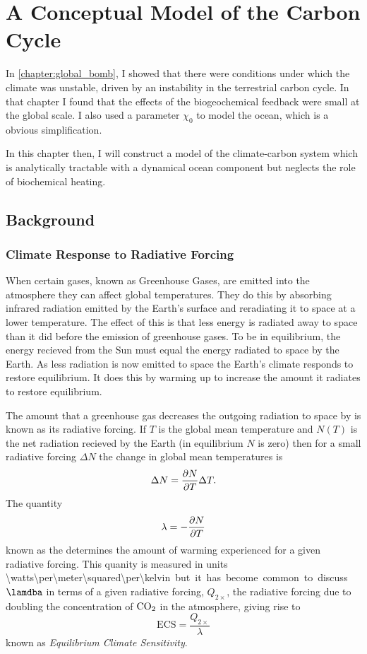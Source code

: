 \chapter{A Conceptual Model of the Carbon Cycle}
\label{chapter:conceptual_carbon_cycle}
\graphicspath{{box_ocean/figs/}}

In \cref{chapter:global_bomb}, I showed that there were conditions under which the climate was unstable,
driven by an instability in the terrestrial carbon cycle. In that chapter I found that the effects of
the biogeochemical feedback were small at the global scale. I also used a parameter $\chi_0$ to model the ocean,
which is a obvious simplification.

In this chapter then, I will construct a model of the climate-carbon system which is analytically tractable
with a dynamical ocean component but neglects the role of biochemical heating.

\section{Background}

\subsection{Climate Response to Radiative Forcing}
When certain gases, known as Greenhouse Gases, are emitted into the atmosphere they can affect global temperatures.
They do this by absorbing infrared radiation emitted by the Earth's surface and reradiating it to space at a lower temperature.
The effect of this is that less energy is radiated away to space than it did before the emission of greenhouse gases. To be in
equilibrium, the energy recieved from the Sun must equal the energy radiated to space by the Earth. As less radiation is now
emitted to space the Earth's climate responds to restore equilibrium. It does this by warming up to increase the amount it
radiates to restore equilibrium.

The amount that a greenhouse gas decreases the outgoing radiation to space by is known as its radiative forcing. If $T$ is
the global mean temperature and $N(T)$ is the net radiation recieved by the Earth (in equilibrium $N$ is zero) then for a small
radiative forcing $\Delta N$ the change in global mean temperatures is
\begin{equation}
  \label{eq:response_to_radiative_forcing}
  \Delta N = \pdv{N}{T} \Delta T.
\end{equation}
The quantity
\begin{equation}
  \label{eq:climate_sensitivity}
  \lambda = -\pdv{N}{T}
\end{equation}
known as the  determines the amount of warming experienced for a given radiative forcing. This quanity is measured
in units \SI{\watts\per\meter\squared\per\kelvin} but it has become common to discuss $\lamdba$ in terms of a given radiative forcing, $Q_{2\times}$,
the radiative forcing due to doubling the concentration of $\ce{CO2}$ in the atmosphere, giving rise to
\begin{equation}
  \label{eq:definition_of_ECS}
  \mathrm{ECS} = \frac{Q_{2\times}}{\lambda}
\end{equation}
known as \emph{Equilibrium Climate Sensitivity}.
